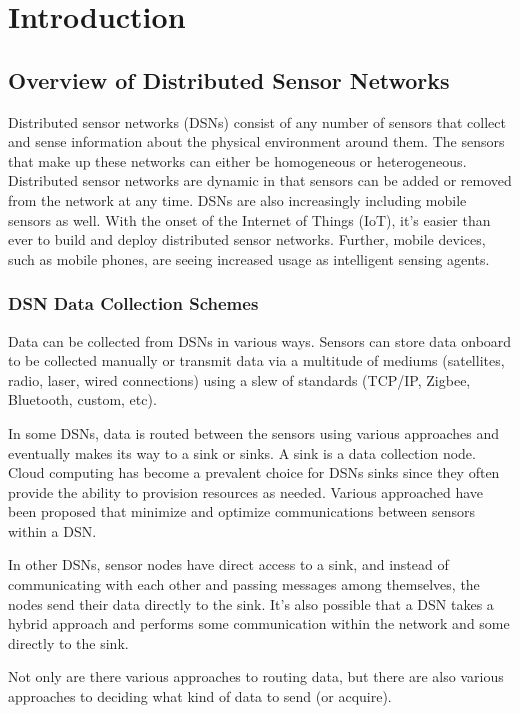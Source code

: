 \chapter{Introduction}

\section{Overview of Distributed Sensor Networks}
Distributed sensor networks (DSNs) consist of any number of sensors that collect and sense information about the physical environment around them. The sensors that make up these networks can either be homogeneous or heterogeneous. Distributed sensor networks are dynamic in that sensors can be added or removed from the network at any time. DSNs are also increasingly including mobile sensors as well. With the onset of the Internet of Things (IoT), it’s easier than ever to build and deploy distributed sensor networks. Further, mobile devices, such as mobile phones, are seeing increased usage as intelligent sensing agents.

\subsection{DSN Data Collection Schemes}
Data can be collected from DSNs in various ways. Sensors can store data onboard to be collected manually or transmit data via a multitude of mediums (satellites, radio, laser, wired connections) using a slew of standards (TCP/IP, Zigbee, Bluetooth, custom, etc).

In some DSNs, data is routed between the sensors using various approaches %
and eventually makes its way to a sink or sinks. A sink is a data collection node. Cloud computing has become a prevalent choice for DSNs sinks since they often provide the ability to provision resources as needed. Various approached have been proposed that minimize and optimize communications between sensors within a DSN. %

In other DSNs, sensor nodes have direct access to a sink, and instead of communicating with each other and passing messages among themselves, the nodes send their data directly to the sink. It's also possible that a DSN takes a hybrid approach and performs some communication within the network and some directly to the sink.

Not only are there various approaches to routing data, but there are also various approaches to deciding what kind of data to send (or acquire).

